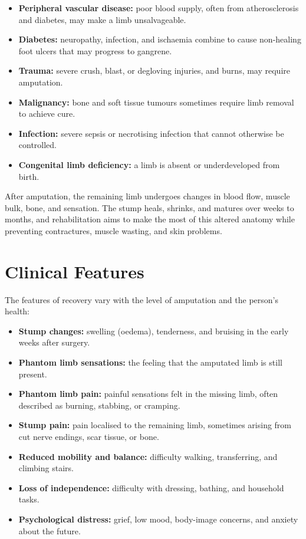 \begin{itemize}
    \item \textbf{Peripheral vascular disease:} poor blood supply, often from atherosclerosis and diabetes, may make a limb unsalvageable.
    \item \textbf{Diabetes:} neuropathy, infection, and ischaemia combine to cause non-healing foot ulcers that may progress to gangrene.
    \item \textbf{Trauma:} severe crush, blast, or degloving injuries, and burns, may require amputation.
    \item \textbf{Malignancy:} bone and soft tissue tumours sometimes require limb removal to achieve cure.
    \item \textbf{Infection:} severe sepsis or necrotising infection that cannot otherwise be controlled.
    \item \textbf{Congenital limb deficiency:} a limb is absent or underdeveloped from birth.
\end{itemize}

After amputation, the remaining limb undergoes changes in blood flow, muscle bulk, bone, and sensation. The stump heals, shrinks, and matures over weeks to months, and rehabilitation aims to make the most of this altered anatomy while preventing contractures, muscle wasting, and skin problems.

\section*{Clinical Features}
The features of recovery vary with the level of amputation and the person's health:

\begin{itemize}
    \item \textbf{Stump changes:} swelling (oedema), tenderness, and bruising in the early weeks after surgery.
    \item \textbf{Phantom limb sensations:} the feeling that the amputated limb is still present.
    \item \textbf{Phantom limb pain:} painful sensations felt in the missing limb, often described as burning, stabbing, or cramping.
    \item \textbf{Stump pain:} pain localised to the remaining limb, sometimes arising from cut nerve endings, scar tissue, or bone.
    \item \textbf{Reduced mobility and balance:} difficulty walking, transferring, and climbing stairs.
    \item \textbf{Loss of independence:} difficulty with dressing, bathing, and household tasks.
    \item \textbf{Psychological distress:} grief, low mood, body-image concerns, and anxiety about the future.
\end{itemize}

